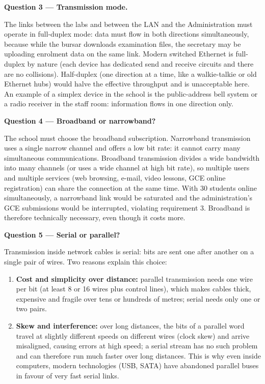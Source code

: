 \documentclass[11pt]{article}
\newcommand{\cle}[1]{{\popxbold\color{popdark}#1}}
\begin{document}
\textbf{Question 3 — Transmission mode.}\par

The links between the labs and between the LAN and the Administration must operate in \cle{full-duplex} mode: data must flow in both directions simultaneously, because while the bursar downloads examination files, the secretary may be uploading enrolment data on the same link. Modern switched Ethernet is full-duplex by nature (each device has dedicated send and receive circuits and there are no collisions). Half-duplex (one direction at a time, like a walkie-talkie or old Ethernet hubs) would halve the effective throughput and is unacceptable here. An example of a simplex device in the school is the public-address bell system or a radio receiver in the staff room: information flows in one direction only.

\textbf{Question 4 — Broadband or narrowband?}\par

The school must choose the \cle{broadband} subscription. Narrowband transmission uses a single narrow channel and offers a low bit rate: it cannot carry many simultaneous communications. Broadband transmission divides a wide bandwidth into many channels (or uses a wide channel at high bit rate), so multiple users and multiple services (web browsing, e-mail, video lessons, GCE online registration) can share the connection at the same time. With 30 students online simultaneously, a narrowband link would be saturated and the administration's GCE submissions would be interrupted, violating requirement 3. Broadband is therefore technically necessary, even though it costs more.

\textbf{Question 5 — Serial or parallel?}\par

Transmission inside network cables is \cle{serial}: bits are sent one after another on a single pair of wires. Two reasons explain this choice:

\begin{enumerate}
\item \textbf{Cost and simplicity over distance:} parallel transmission needs one wire per bit (at least 8 or 16 wires plus control lines), which makes cables thick, expensive and fragile over tens or hundreds of metres; serial needs only one or two pairs.
\item \textbf{Skew and interference:} over long distances, the bits of a parallel word travel at slightly different speeds on different wires (clock skew) and arrive misaligned, causing errors at high speed; a serial stream has no such problem and can therefore run much faster over long distances. This is why even inside computers, modern technologies (USB, SATA) have abandoned parallel buses in favour of very fast serial links.
\end{enumerate}
\end{document}

